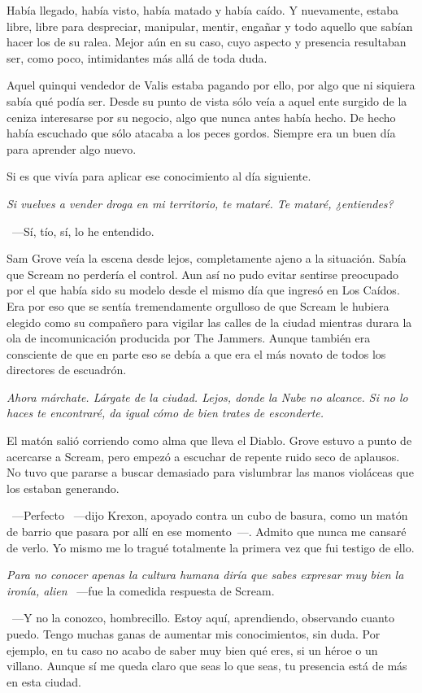 Había llegado, había visto, había matado y había caído. Y nuevamente, estaba libre, libre para despreciar, manipular, mentir, engañar y todo aquello que sabían hacer los de su ralea. Mejor aún en su caso, cuyo aspecto y presencia resultaban ser, como poco, intimidantes más allá de toda duda.

Aquel quinqui vendedor de Valis estaba pagando por ello, por algo que ni siquiera sabía qué podía ser. Desde su punto de vista sólo veía a aquel ente surgido de la ceniza interesarse por su negocio, algo que nunca antes había hecho. De hecho había escuchado que sólo atacaba a los peces gordos. Siempre era un buen día para aprender algo nuevo.

Si es que vivía para aplicar ese conocimiento al día siguiente.

\emph{Si vuelves a vender droga en mi territorio, te mataré. Te mataré, ¿entiendes?}

~---Sí, tío, sí, lo he entendido.

Sam Grove veía la escena desde lejos, completamente ajeno a la situación. Sabía que Scream no perdería el control. Aun así no pudo evitar sentirse preocupado por el que había sido su modelo desde el mismo día que ingresó en Los Caídos. Era por eso que se sentía tremendamente orgulloso de que Scream le hubiera elegido como su compañero para vigilar las calles de la ciudad mientras durara la ola de incomunicación producida por The Jammers. Aunque también era consciente de que en parte eso se debía a que era el más novato de todos los directores de escuadrón.

\emph{Ahora márchate. Lárgate de la ciudad. Lejos, donde la Nube no alcance. Si no lo haces te encontraré, da igual cómo de bien trates de esconderte.}

El matón salió corriendo como alma que lleva el Diablo. Grove estuvo a punto de acercarse a Scream, pero empezó a escuchar de repente ruido seco de aplausos. No tuvo que pararse a buscar demasiado para vislumbrar las manos violáceas que los estaban generando.

~---Perfecto ~---dijo Krexon, apoyado contra un cubo de basura, como un matón de barrio que pasara por allí en ese momento~---. Admito que nunca me cansaré de verlo. Yo mismo me lo tragué totalmente la primera vez que fui testigo de ello.

\emph{Para no conocer apenas la cultura humana diría que sabes expresar muy bien la ironía, alien} ~---fue la comedida respuesta de Scream.

~---Y no la conozco, hombrecillo. Estoy aquí, aprendiendo, observando cuanto puedo. Tengo muchas ganas de aumentar mis conocimientos, sin duda. Por ejemplo, en tu caso no acabo de saber muy bien qué eres, si un héroe o un villano. Aunque sí me queda claro que seas lo que seas, tu presencia está de más en esta ciudad.

